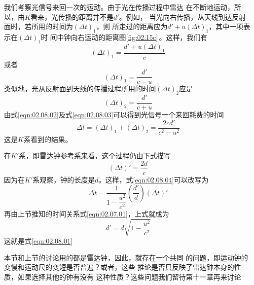 我们考察光信号来回一次的运动。由于光在传播过程中雷达
在不断地运动，所以，由$K$看来，光传播的距离并不是$d'$。例如，
当光向右传播，从天线到达反射面时，若所用的时间为$(\Delta t)_1$，则
所走过的距离应为$ d ' + u ( \Delta t ) _ { 1 }$，其中一项表示在$(\Delta t)_1$时
间中钟向右运动的距离\lhbrak 图\ref{fig:02.15c}\,\rhbrak 。这样，我们有
\begin{equation*}
    ( \Delta t ) _ { 1 } = \frac { d ' + u (\Delta t)_1 } { c }
\end{equation*}
或者
\begin{equation}\label{eqn:02.08.02}
    ( \Delta t ) _ { 1 } = \frac { d ' } { c - u }
\end{equation}
类似地，光从反射面到天线的传播过程所用的时间$ (\Delta t)_2 $应是
\begin{equation}\label{eqn:02.08.03}
    ( \Delta t ) _ { 2 } = \frac { d ' } { c + u }
\end{equation}
由式\eqref{eqn:02.08.02}及式\eqref{eqn:02.08.03}可以得到光信号一个来回耗费的时间
\begin{equation}\label{eqn:02.08.04}
    \Delta t = ( \Delta t ) _ { 1 } + ( \Delta t ) _ { 2 } =  \frac { 2 c d ' } { c ^ { 2 } - u ^ { 2 } }
\end{equation}
这是$K$系看到的结果。

在$K'$系，即雷达钟参考系来看，这个过程仍由下式描写
\begin{equation*}
    ( \Delta t ) ' = \frac { 2 d } { c }
\end{equation*}
因为在$K'$系观察，钟的长度是$d$。这样，式\eqref{eqn:02.08.04}可以改写为
\begin{equation*}
    \Delta t = \frac { 1 } { 1 - \dfrac { u ^ { 2 } } { c ^ { 2 } } } \left ( \frac { d ' } { d } \right) \left( \Delta t \right) '
\end{equation*}
再由上节推知的时间关系式\eqref{eqn:02.07.01}，上式就成为
\begin{equation*}
    d ' = d \sqrt { 1 - \frac { u ^ { 2 } } { c ^ { 2 } } }
\end{equation*}
\clearpage
\noindent 这就是式\eqref{eqn:02.08.01}

本节和上节的讨论用的都是雷达钟，因此，就存在一个共同
的问题，即运动钟的变慢和运动尺的变短是否普遍？或者，这些
推论是否只反映了雷达钟本身的性质，如果选择其他的钟有没有
这种性质？这些问题我们留待第十一章再来讨论
